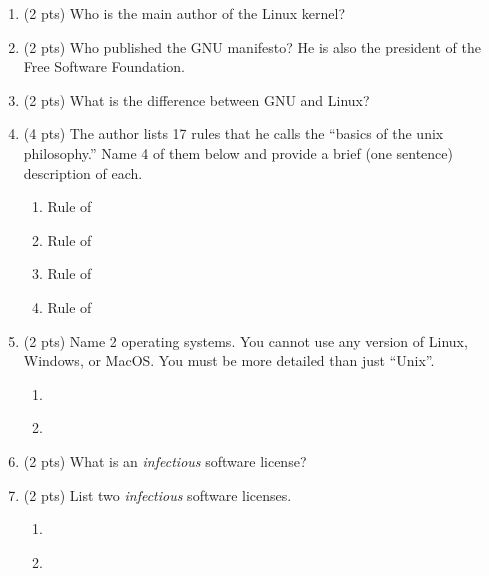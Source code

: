 \documentclass{article}
\begin{document}
\begin{enumerate}

\item
(2 pts)
Who is the main author of the Linux kernel?
\vspace{0.75in}

\item
(2 pts)
Who published the GNU manifesto?
He is also the president of the Free Software Foundation.
\vspace{0.75in}

\item
(2 pts)
What is the difference between GNU and Linux?
\vspace{0.75in}

\item
(4 pts)
The author lists 17 rules that he calls the ``basics of the unix philosophy.''
Name 4 of them below and provide a brief (one sentence) description of each.
\begin{enumerate}
\item Rule of
\vspace{0.75in}
\item Rule of
\vspace{0.75in}
\item Rule of
\vspace{0.75in}
\item Rule of
\vspace{0.75in}
\end{enumerate}

\item
(2 pts)
Name 2 operating systems.
You cannot use any version of Linux, Windows, or MacOS.
You must be more detailed than just ``Unix''.
\begin{enumerate}
\item ~
\vspace{0.5in}
\item ~
\vspace{0.5in}
\end{enumerate}

\item
(2 pts)
What is an \emph{infectious} software license?
\vspace{1in}

\item
(2 pts)
List two \emph{infectious} software licenses.
\begin{enumerate}
\item ~
\vspace{0.5in}
\item ~
\vspace{0.5in}
\end{enumerate}


\end{enumerate}
\end{document}
